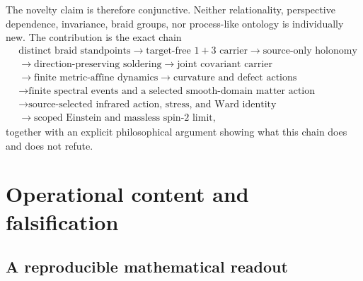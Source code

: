 The novelty claim is therefore conjunctive. Neither relationality, perspective dependence, invariance, braid groups, nor process-like ontology is individually new. The contribution is the exact chain
\begin{equation}\label{eq:novelchain}
\begin{aligned}
&\text{distinct braid standpoints}
\longrightarrow\text{target-free $1+3$ carrier}
\longrightarrow\text{source-only holonomy}\\
&\longrightarrow\text{direction-preserving soldering}
\longrightarrow\text{joint covariant carrier}\\
&\longrightarrow\text{finite metric-affine dynamics}
\longrightarrow\text{curvature and defect actions}\\
&\longrightarrow\text{finite spectral events and a selected smooth-domain matter action}\\
&\longrightarrow\text{source-selected infrared action, stress, and Ward identity}\\
&\longrightarrow\text{scoped Einstein and massless spin-2 limit},
\end{aligned}
\end{equation}
together with an explicit philosophical argument showing what this chain does and does not refute.

\section{Operational content and falsification}

\subsection{A reproducible mathematical readout}

